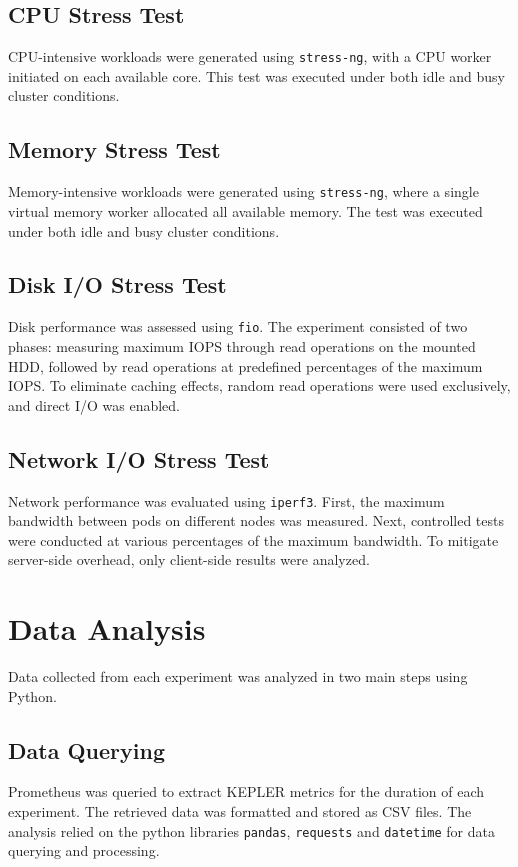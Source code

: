 \subsection{CPU Stress Test}
CPU-intensive workloads were generated using \texttt{stress-ng}, with a CPU worker initiated on each available core. This test was executed under both idle and busy cluster conditions.

\subsection{Memory Stress Test}
Memory-intensive workloads were generated using \texttt{stress-ng}, where a single virtual memory worker allocated all available memory. The test was executed under both idle and busy cluster conditions.

\subsection{Disk I/O Stress Test}
Disk performance was assessed using \texttt{fio}. The experiment consisted of two phases: measuring maximum IOPS through read operations on the mounted HDD, followed by read operations at predefined percentages of the maximum IOPS. To eliminate caching effects, random read operations were used exclusively, and direct I/O was enabled.

\subsection{Network I/O Stress Test}
Network performance was evaluated using \texttt{iperf3}. First, the maximum bandwidth between pods on different nodes was measured. Next, controlled tests were conducted at various percentages of the maximum bandwidth. To mitigate server-side overhead, only client-side results were analyzed.

\section{Data Analysis}
Data collected from each experiment was analyzed in two main steps using Python.

\subsection{Data Querying}
Prometheus was queried to extract KEPLER metrics for the duration of each experiment. The retrieved data was formatted and stored as CSV files. The analysis relied on the python libraries \texttt{pandas}, \texttt{requests} and \texttt{datetime} for data querying and processing.

